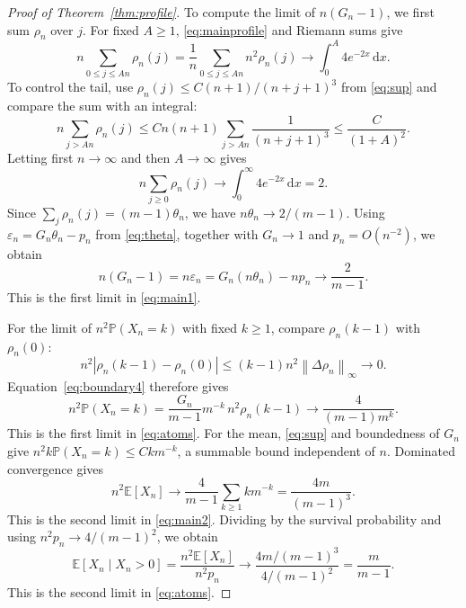 \documentclass[11pt,letterpaper,reqno]{amsart}
\numberwithin{equation}{section}
\theoremstyle{plain}
\theoremstyle{remark}
\newcommand{\E}{\mathbb E}\newcommand{\Pp}{\mathbb P}
\newcommand{\dd}{\,\mathrm d}
\newcommand{\norm}[1]{\left\lVert#1\right\rVert}
\begin{document}
\begin{proof}[Proof of Theorem~\ref{thm:profile}]
To compute the limit of $n(G_n-1)$, we first sum $\rho_n$ over $j$. For fixed $A\ge1$, \eqref{eq:mainprofile} and Riemann sums give
\[
 n\sum_{0\le j\le An}\rho_n(j)
 =\frac1n\sum_{0\le j\le An}n^2\rho_n(j)
 \longrightarrow\int_0^A4e^{-2x}\dd x.
\]
To control the tail, use $\rho_n(j)\le C(n+1)/(n+j+1)^3$ from \eqref{eq:sup} and compare the sum with an integral:
\[
 n\sum_{j>An}\rho_n(j)
 \le Cn(n+1)\sum_{j>An}\frac1{(n+j+1)^3}
 \le\frac{C}{(1+A)^2}.
\]
Letting first $n\to\infty$ and then $A\to\infty$ gives
\[
 n\sum_{j\ge0}\rho_n(j)
 \longrightarrow\int_0^\infty4e^{-2x}\dd x=2.
\]
Since $\sum_j\rho_n(j)=(m-1)\theta_n$, we have $n\theta_n\to2/(m-1)$. Using $\varepsilon_n=G_n\theta_n-p_n$ from \eqref{eq:theta}, together with $G_n\to1$ and $p_n=O(n^{-2})$, we obtain
\[
 n(G_n-1)=n\varepsilon_n=G_n(n\theta_n)-np_n
 \longrightarrow\frac2{m-1}.
\]
This is the first limit in \eqref{eq:main1}.

For the limit of $n^2\Pp(X_n=k)$ with fixed $k\ge1$, compare $\rho_n(k-1)$ with $\rho_n(0)$:
\[
 n^2|\rho_n(k-1)-\rho_n(0)|
 \le(k-1)n^2\norm{\Delta\rho_n}_\infty\longrightarrow0.
\]
Equation~\eqref{eq:boundary4} therefore gives
\[
 n^2\Pp(X_n=k)
 =\frac{G_n}{m-1}m^{-k}\,n^2\rho_n(k-1)
 \longrightarrow\frac4{(m-1)m^k}.
\]
This is the first limit in \eqref{eq:atoms}.
For the mean, \eqref{eq:sup} and boundedness of $G_n$ give $n^2k\Pp(X_n=k)\le Ckm^{-k}$, a summable bound independent of $n$. Dominated convergence gives
\[
 n^2\E[X_n]\longrightarrow\frac4{m-1}\sum_{k\ge1}km^{-k}
 =\frac{4m}{(m-1)^3}.
\]
This is the second limit in \eqref{eq:main2}.
Dividing by the survival probability and using $n^2p_n\to4/(m-1)^2$, we obtain
\[
 \E[X_n\mid X_n>0]
 =\frac{n^2\E[X_n]}{n^2p_n}
 \longrightarrow
 \frac{4m/(m-1)^3}{4/(m-1)^2}
 =\frac m{m-1}.
\]
This is the second limit in \eqref{eq:atoms}.


\end{proof}
\end{document}
